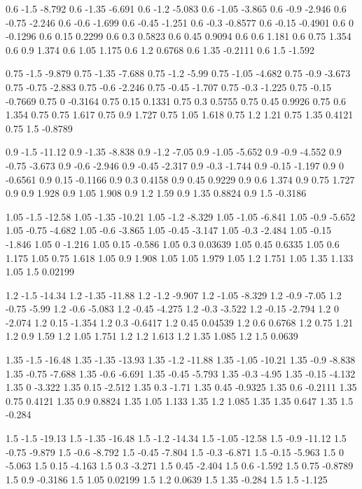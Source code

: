 0.6 -1.5 -8.792
0.6 -1.35 -6.691
0.6 -1.2 -5.083
0.6 -1.05 -3.865
0.6 -0.9 -2.946
0.6 -0.75 -2.246
0.6 -0.6 -1.699
0.6 -0.45 -1.251
0.6 -0.3 -0.8577
0.6 -0.15 -0.4901
0.6 0 -0.1296
0.6 0.15 0.2299
0.6 0.3 0.5823
0.6 0.45 0.9094
0.6 0.6 1.181
0.6 0.75 1.354
0.6 0.9 1.374
0.6 1.05 1.175
0.6 1.2 0.6768
0.6 1.35 -0.2111
0.6 1.5 -1.592

0.75 -1.5 -9.879
0.75 -1.35 -7.688
0.75 -1.2 -5.99
0.75 -1.05 -4.682
0.75 -0.9 -3.673
0.75 -0.75 -2.883
0.75 -0.6 -2.246
0.75 -0.45 -1.707
0.75 -0.3 -1.225
0.75 -0.15 -0.7669
0.75 0 -0.3164
0.75 0.15 0.1331
0.75 0.3 0.5755
0.75 0.45 0.9926
0.75 0.6 1.354
0.75 0.75 1.617
0.75 0.9 1.727
0.75 1.05 1.618
0.75 1.2 1.21
0.75 1.35 0.4121
0.75 1.5 -0.8789

0.9 -1.5 -11.12
0.9 -1.35 -8.838
0.9 -1.2 -7.05
0.9 -1.05 -5.652
0.9 -0.9 -4.552
0.9 -0.75 -3.673
0.9 -0.6 -2.946
0.9 -0.45 -2.317
0.9 -0.3 -1.744
0.9 -0.15 -1.197
0.9 0 -0.6561
0.9 0.15 -0.1166
0.9 0.3 0.4158
0.9 0.45 0.9229
0.9 0.6 1.374
0.9 0.75 1.727
0.9 0.9 1.928
0.9 1.05 1.908
0.9 1.2 1.59
0.9 1.35 0.8824
0.9 1.5 -0.3186

1.05 -1.5 -12.58
1.05 -1.35 -10.21
1.05 -1.2 -8.329
1.05 -1.05 -6.841
1.05 -0.9 -5.652
1.05 -0.75 -4.682
1.05 -0.6 -3.865
1.05 -0.45 -3.147
1.05 -0.3 -2.484
1.05 -0.15 -1.846
1.05 0 -1.216
1.05 0.15 -0.586
1.05 0.3 0.03639
1.05 0.45 0.6335
1.05 0.6 1.175
1.05 0.75 1.618
1.05 0.9 1.908
1.05 1.05 1.979
1.05 1.2 1.751
1.05 1.35 1.133
1.05 1.5 0.02199

1.2 -1.5 -14.34
1.2 -1.35 -11.88
1.2 -1.2 -9.907
1.2 -1.05 -8.329
1.2 -0.9 -7.05
1.2 -0.75 -5.99
1.2 -0.6 -5.083
1.2 -0.45 -4.275
1.2 -0.3 -3.522
1.2 -0.15 -2.794
1.2 0 -2.074
1.2 0.15 -1.354
1.2 0.3 -0.6417
1.2 0.45 0.04539
1.2 0.6 0.6768
1.2 0.75 1.21
1.2 0.9 1.59
1.2 1.05 1.751
1.2 1.2 1.613
1.2 1.35 1.085
1.2 1.5 0.0639

1.35 -1.5 -16.48
1.35 -1.35 -13.93
1.35 -1.2 -11.88
1.35 -1.05 -10.21
1.35 -0.9 -8.838
1.35 -0.75 -7.688
1.35 -0.6 -6.691
1.35 -0.45 -5.793
1.35 -0.3 -4.95
1.35 -0.15 -4.132
1.35 0 -3.322
1.35 0.15 -2.512
1.35 0.3 -1.71
1.35 0.45 -0.9325
1.35 0.6 -0.2111
1.35 0.75 0.4121
1.35 0.9 0.8824
1.35 1.05 1.133
1.35 1.2 1.085
1.35 1.35 0.647
1.35 1.5 -0.284

1.5 -1.5 -19.13
1.5 -1.35 -16.48
1.5 -1.2 -14.34
1.5 -1.05 -12.58
1.5 -0.9 -11.12
1.5 -0.75 -9.879
1.5 -0.6 -8.792
1.5 -0.45 -7.804
1.5 -0.3 -6.871
1.5 -0.15 -5.963
1.5 0 -5.063
1.5 0.15 -4.163
1.5 0.3 -3.271
1.5 0.45 -2.404
1.5 0.6 -1.592
1.5 0.75 -0.8789
1.5 0.9 -0.3186
1.5 1.05 0.02199
1.5 1.2 0.0639
1.5 1.35 -0.284
1.5 1.5 -1.125

